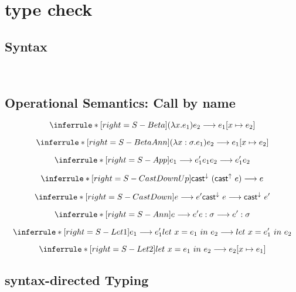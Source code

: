 \section{type check}

\subsection{Syntax}
\gram{
      \otte\ottinterrule
      \ottR\ottinterrule
      \ottt\ottinterrule
  }
\\[2.0mm]

\subsection{Operational Semantics: Call by name}

\newcommand{\castupe}{\ensuremath{\mathsf{cast}^{\uparrow}\ }}
\newcommand{\castdowne}{\ensuremath{\mathsf{cast}^{\downarrow}\ }}

\[
\inferrule*[right=S-Beta]
{  }
{ (\lambda x. e_1) e_2 \longrightarrow e_1 [x\mapsto e_2] }
\]

\[
\inferrule*[right=S-BetaAnn]
{  }
{ (\lambda x:\sigma. e_1) e_2 \longrightarrow e_1 [x\mapsto e_2] }
\]

\[
\inferrule*[right=S-App]
{ e_1 \longrightarrow e_1'  }
{ e_1 e_2 \longrightarrow e_1' e_2}
\]

\[
\inferrule*[right=S-CastDownUp]
{  }
{ \castdowne (\castupe e)  \longrightarrow e }
\]

\[
\inferrule*[right=S-CastDown]
{ e \longrightarrow e' }
{ \castdowne  e  \longrightarrow  \castdowne  e' }
\]

\[
\inferrule*[right=S-Ann]
{ e \longrightarrow e'  }
{ e:\sigma \longrightarrow e':\sigma}
\]

\[
\inferrule*[right=S-Let1]
{ e_1 \longrightarrow e_1'  }
{ let\ x = e_1\ in\ e_2 \longrightarrow let\ x = e_1'\ in\ e_2 }
\]

\[
\inferrule*[right=S-Let2]
{  }
{ let\ x = e_1\ in\ e_2 \longrightarrow e_2[x\mapsto e_1] }
\]

\subsection{syntax-directed Typing}

\newcommand{\checktype}{\Gamma\vdash_\Downarrow}
\newcommand{\infertype}{\Gamma\vdash_\Uparrow}
\newcommand{\infercheck}{\Gamma\vdash_\delta}

\newcommand{\checktypeno}{\vdash_\Downarrow}
\newcommand{\infertypeno}{\vdash_\Uparrow}
\newcommand{\infercheckno}{\vdash_\delta}

